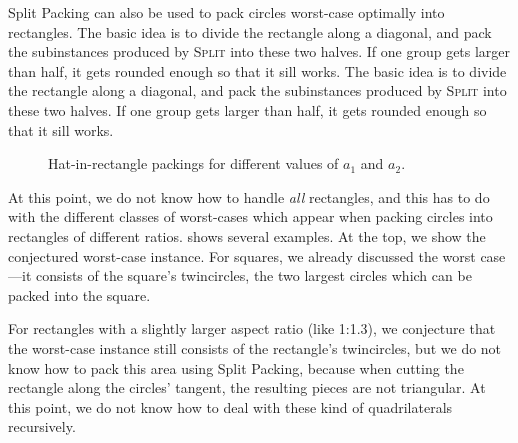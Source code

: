 \documentclass[a4paper,style=print,oneside,bibliography=totoc,nexus,lnum,extramargin]{tubsbook}
\begin{document}
Split Packing can also be used to pack circles worst-case optimally into rectangles. The basic idea is to divide the rectangle along a diagonal, and pack the subinstances produced by \textsc{Split} into these two halves. If one group gets larger than half, it gets rounded enough so that it sill works. The basic idea is to divide the rectangle along a diagonal, and pack the subinstances produced by \textsc{Split} into these two halves. If one group gets larger than half, it gets rounded enough so that it sill works.

\begin{figure}

    \vspace{5mm}


    \caption{Hat-in-rectangle packings for different values of $a_1$ and $a_2$.}
    \label{fig:hats-in-rect}
\end{figure}

At this point, we do not know how to handle \emph{all} rectangles, and this has to do with the different classes of worst-cases which appear when packing circles into rectangles of different ratios.  shows several examples. At the top, we show the conjectured worst-case instance. For squares, we already discussed the worst case---it consists of the square's twincircles, the two largest circles which can be packed into the square.

For rectangles with a slightly larger aspect ratio (like 1:1.3), we conjecture that the worst-case instance still consists of the rectangle's twincircles, but we do not know how to pack this area using Split Packing, because when cutting the rectangle along the circles' tangent, the resulting pieces are not triangular. At this point, we do not know how to deal with these kind of quadrilaterals recursively.
\end{document}
